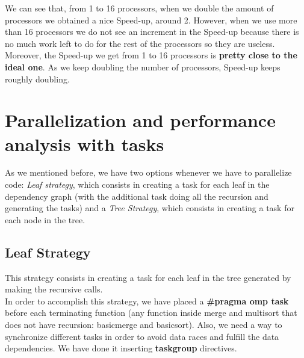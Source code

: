 \documentclass[12]{article}
\begin{document}
We can see that, from 1 to 16 processors, when we double the amount of processors we obtained a nice Speed-up, around 2. However, when we use more than 16 processors we do not see an increment in the Speed-up because there is no much work left to do for the rest of the processors so they are useless. Moreover, the Speed-up we get from 1 to 16 processors is \textbf{pretty close to the ideal one}. As we keep doubling the number of processors, Speed-up keeps roughly doubling.

\section{Parallelization and performance analysis with tasks}
As we mentioned before, we have two options whenever we have to parallelize code: \textit{Leaf strategy}, which consists in creating a task for each leaf in the dependency graph (with the additional task doing all the recursion and generating the tasks) and a \textit{Tree Strategy}, which consists in creating a task for each node in the tree. 


\subsection{Leaf Strategy}
This strategy consists in creating a task for each leaf in the tree generated by making the recursive calls. 
\\
In order to accomplish this strategy, we have placed a \textbf{\#pragma omp task} before each terminating function (any function inside merge and multisort that does not have recursion: basicmerge and basicsort). Also, we need a way to synchronize different tasks in order to avoid data races and fulfill the data dependencies. We have done it inserting \textbf{taskgroup} directives.
\\
\medskip
\end{document}
